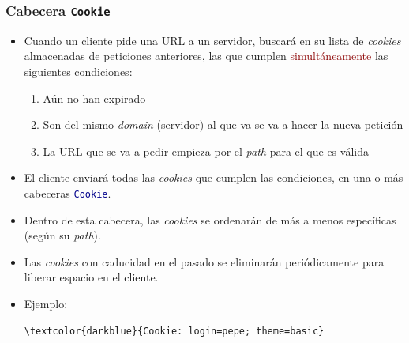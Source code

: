 \documentclass[hyperref={pdfpagelabels=true},ucs]{beamer}
\newcommand{\res}[1]{\textcolor{darkred}{#1}}
\begin{document}
\begin{frame}[fragile]
\frametitle{Cabecera \texttt{Cookie}}

\begin{itemize}
\item Cuando un cliente pide una URL a un servidor, buscará en su
  lista de \emph{cookies} almacenadas de peticiones anteriores, las que
  cumplen \res{simultáneamente} las siguientes condiciones:
  \begin{enumerate}
  \item Aún no han expirado
  \item Son del mismo \emph{domain} (servidor) al que va se va a hacer
    la nueva petición
  \item La URL que se va a pedir empieza por el \emph{path} para el
    que es válida
  \end{enumerate}

\item El cliente enviará todas las \emph{cookies} que cumplen las
  condiciones, en una o más cabeceras \textcolor{darkblue}{\Verb|Cookie|}.

\item Dentro de esta cabecera, las \emph{cookies} se ordenarán de más
  a menos específicas (según su \emph{path}).

\item Las \emph{cookies} con caducidad en el pasado se eliminarán
  periódicamente para liberar espacio en el cliente.

\item Ejemplo:\\
\hspace{-4mm}\begin{scriptsize}
\begin{Verbatim}
\textcolor{darkblue}{Cookie: login=pepe; theme=basic}
\end{Verbatim}
\end{scriptsize}

\end{itemize}

\end{frame}

\end{document}
